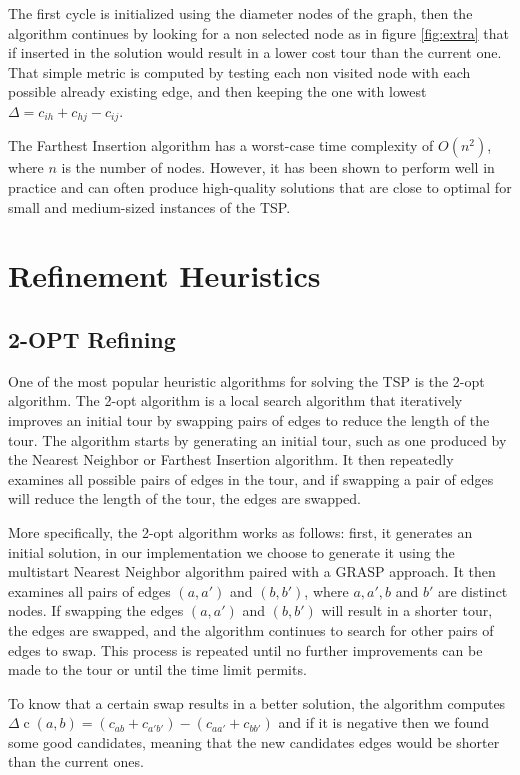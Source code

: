 The first cycle is initialized using the diameter nodes of the graph, then the algorithm continues by looking for a non selected node as in figure \ref{fig:extra} that if inserted in the solution would result in a lower cost tour than the current one.
That simple metric is computed by testing each non visited node with each possible already existing edge, and then keeping the one with lowest $\Delta = c_{ih} + c_{hj} - c_{ij}$.

The Farthest Insertion algorithm has a worst-case time complexity of $O(n^2)$, where $n$ is the number of nodes. However, it has been shown to perform well in practice and can often produce high-quality solutions that are close to optimal for small and medium-sized instances of the TSP.

\section{Refinement Heuristics}
\subsection{2-OPT Refining}
One of the most popular heuristic algorithms for solving the TSP is the 2-opt algorithm.
The 2-opt algorithm is a local search algorithm that iteratively improves an initial tour by swapping pairs of edges to reduce the length of the tour. The algorithm starts by generating an initial tour, such as one produced by the Nearest Neighbor or Farthest Insertion algorithm. It then repeatedly examines all possible pairs of edges in the tour, and if swapping a pair of edges will reduce the length of the tour, the edges are swapped.

More specifically, the 2-opt algorithm works as follows: first, it generates an initial solution, in our implementation we choose to generate it using the multistart Nearest Neighbor algorithm paired with a GRASP approach. It then examines all pairs of edges $(a,a')$ and $(b,b')$, where $a,a',b$ and $b'$ are distinct nodes. If swapping the edges $(a,a')$ and $(b,b')$ will result in a shorter tour, the edges are swapped, and the algorithm continues to search for other pairs of edges to swap. This process is repeated until no further improvements can be made to the tour or until the time limit permits.

To know that a certain swap results in a better solution, the algorithm computes $\Delta \operatorname{c}(a,b) = (c_{ab} + c_{a'b'}) - (c_{aa'} + c_{bb'})$ and if it is negative then we found some good candidates, meaning that the new candidates edges would be shorter than the current ones.

